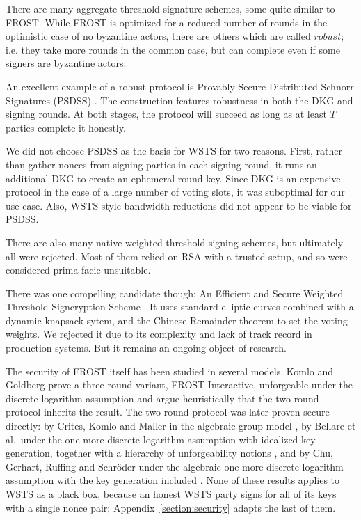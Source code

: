 \documentclass{article}
\theoremstyle{plain}
\theoremstyle{definition}
\theoremstyle{remark}
\begin{document}
There are many aggregate threshold signature schemes, some quite similar to FROST.  While FROST is optimized for a reduced number of rounds in the optimistic case of no byzantine actors, there are others which are called $robust$; i.e. they take more rounds in the common case, but can complete even if some signers are byzantine actors.

An excellent example of a robust protocol is Provably Secure Distributed Schnorr Signatures (PSDSS) \cite{psdss}.  The construction features robustness in both the DKG and signing rounds.  At both stages, the protocol will succeed as long as at least $T$ parties complete it honestly.

We did not choose PSDSS as the basis for WSTS for two reasons.  First, rather than gather nonces from signing parties in each signing round, it runs an additional DKG to create an ephemeral round key.  Since DKG is an expensive protocol in the case of a large number of voting slots, it was suboptimal for our use case.  Also, WSTS-style bandwidth reductions did not appear to be viable for PSDSS.

There are also many native weighted threshold signing schemes, but ultimately all were rejected.  Most of them relied on RSA with a trusted setup, and so were considered prima facie unsuitable.

There was one compelling candidate though: An Efficient and Secure Weighted Threshold Signcryption Scheme \cite{eswtss}.  It uses standard elliptic curves combined with a dynamic knapsack sytem, and the Chinese Remainder theorem to set the voting weights.  We rejected it due to its complexity and lack of track record in production systems.  But it remains an ongoing object of research.

The security of FROST itself has been studied in several models.  Komlo and Goldberg \cite{frost} prove a three-round variant, FROST-Interactive, unforgeable under the discrete logarithm assumption and argue heuristically that the two-round protocol inherits the result.  The two-round protocol was later proven secure directly: by Crites, Komlo and Maller in the algebraic group model \cite{ckm21}, by Bellare et al.\ under the one-more discrete logarithm assumption with idealized key generation, together with a hierarchy of unforgeability notions \cite{bckmtz22, btz22}, and by Chu, Gerhart, Ruffing and Schr\"oder under the algebraic one-more discrete logarithm assumption with the key generation included \cite{cgrs23}.  None of these results applies to WSTS as a black box, because an honest WSTS party signs for all of its keys with a single nonce pair; Appendix~\ref{section:security} adapts the last of them.
\end{document}
